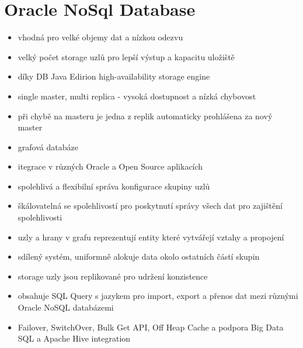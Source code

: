 \documentclass[czech,bachelor,dept460,male,csharp,cpdeclaration]{diploma}
\begin{document}
		\section{Oracle NoSql Database}
			\begin{itemize}
				\item vhodná pro velké objemy dat a nízkou odezvu
				\item velký počet storage uzlů pro lepší výstup a kapacitu uložiště
				\item díky DB Java Edirion high-availability storage engine
				\item single master, multi replica - vysoká dostupnost a nízká chybovost
				\item při chybě na masteru je jedna z replik automaticky prohlášena za nový master
				\item grafová databáze
				\item itegrace v různých Oracle a Open Source aplikacích
				\item spolehlivá a flexibilní správa konfigurace skupiny uzlů
				\item škálovatelná se spolehlivostí pro poskytnutí správy všech dat pro zajištění spolehlivosti
				\item uzly a hrany v grafu reprezentují entity které vytvářejí vztahy a propojení
				\item sdílený systém, uniformně alokuje data okolo ostatních částí skupin
				\item storage uzly jsou replikované pro udržení konzistence
				\item obsahuje SQL Query s jazykem pro import, export a přenos dat mezi různými Oracle NoSQL databázemi
				\item Failover, SwitchOver, Bulk Get API, Off Heap Cache a podpora Big Data SQL a Apache Hive integration
			\end{itemize}

		
\end{document}
